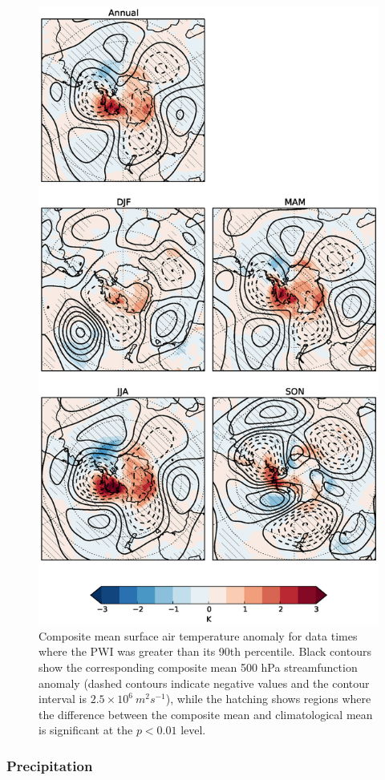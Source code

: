 \begin{figure}
\begin{center}
\includegraphics[width=0.63\columnwidth]{figures/zonalwaves/tas-composite_pwigt90pct_ERAInterim_500hPa_030day-runmean-anom-wrt-all_native-shextropics15.eps}
\caption[Composite mean surface air temperature anomaly for data times where the PWI was greater than its 90th percentile]{\label{fig:tas_composite}
Composite mean surface air temperature anomaly for data times where the PWI was greater than its 90th percentile. Black contours show the corresponding composite mean 500 hPa streamfunction anomaly (dashed contours indicate negative values and the contour interval is $2.5 \times 10^6 \: m^2 s^{-1}$), while the hatching shows regions where the difference between the composite mean and climatological mean is significant at the $p < 0.01$ level.}
\end{center}
\end{figure} 

\subsubsection{Precipitation}

